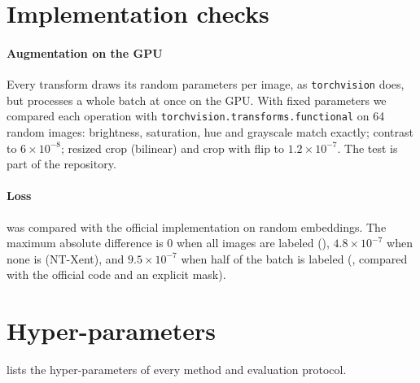 \setcounter{table}{0}\setcounter{figure}{0}\setcounter{equation}{0}
\renewcommand{\thetable}{A.\arabic{table}}\renewcommand{\thefigure}{A.\arabic{figure}}\renewcommand{\theequation}{A.\arabic{equation}}

\section{Implementation checks}
\label{app:impl}

\paragraph{Augmentation on the GPU}
Every transform draws its random parameters per image, as \texttt{torchvision} does, but processes a whole
batch at once on the GPU. With fixed parameters we compared each operation with
\texttt{torchvision.transforms.functional} on 64 random images: brightness, saturation, hue and grayscale
match exactly; contrast to $6\times10^{-8}$; resized crop (bilinear) and crop with flip to
$1.2\times10^{-7}$. The test is part of the repository.

\paragraph{Loss}
 was compared with the official \supcon implementation on random embeddings. The maximum
absolute difference is $0$ when all images are labeled (\supcon), $4.8\times10^{-7}$ when none is (NT-Xent),
and $9.5\times10^{-7}$ when half of the batch is labeled (\union, compared with the official code and an
explicit mask).

\needspace{0.45\textheight}
\section{Hyper-parameters}
\label{app:hparams}
 lists the hyper-parameters of every method and evaluation protocol.


